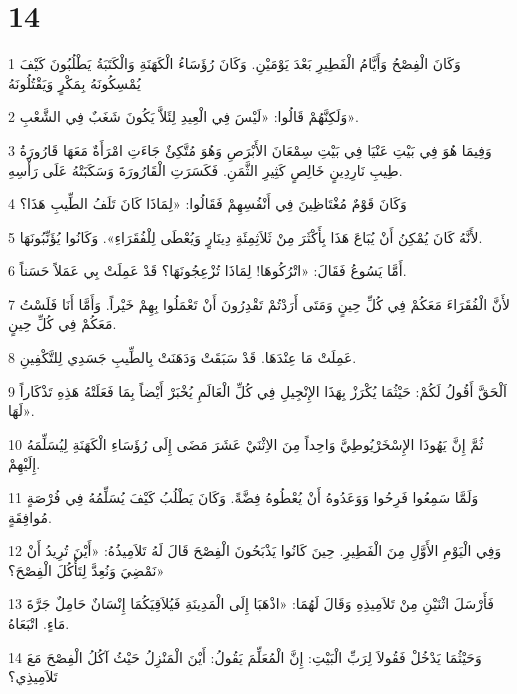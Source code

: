 \chapter{14}

\par 1 وَكَانَ الْفِصْحُ وَأَيَّامُ الْفَطِيرِ بَعْدَ يَوْمَيْنِ. وَكَانَ رُؤَسَاءُ الْكَهَنَةِ وَالْكَتَبَةُ يَطْلُبُونَ كَيْفَ يُمْسِكُونَهُ بِمَكْرٍ وَيَقْتُلُونَهُ
\par 2 وَلَكِنَّهُمْ قَالُوا: «لَيْسَ فِي الْعِيدِ لِئَلاَّ يَكُونَ شَغَبٌ فِي الشَّعْبِ».
\par 3 وَفِيمَا هُوَ فِي بَيْتِ عَنْيَا فِي بَيْتِ سِمْعَانَ الأَبْرَصِ وَهُوَ مُتَّكِئٌ جَاءَتِ امْرَأَةٌ مَعَهَا قَارُورَةُ طِيبِ نَارِدِينٍ خَالِصٍ كَثِيرِ الثَّمَنِ. فَكَسَرَتِ الْقَارُورَةَ وَسَكَبَتْهُ عَلَى رَأْسِهِ.
\par 4 وَكَانَ قَوْمٌ مُغْتَاظِينَ فِي أَنْفُسِهِمْ فَقَالُوا: «لِمَاذَا كَانَ تَلَفُ الطِّيبِ هَذَا؟
\par 5 لأَنَّهُ كَانَ يُمْكِنُ أَنْ يُبَاعَ هَذَا بِأَكْثَرَ مِنْ ثَلاَثِمِئَةِ دِينَارٍ وَيُعْطَى لِلْفُقَرَاءِ». وَكَانُوا يُؤَنِّبُونَهَا.
\par 6 أَمَّا يَسُوعُ فَقَالَ: «اتْرُكُوهَا! لِمَاذَا تُزْعِجُونَهَا؟ قَدْ عَمِلَتْ بِي عَمَلاً حَسَناً.
\par 7 لأَنَّ الْفُقَرَاءَ مَعَكُمْ فِي كُلِّ حِينٍ وَمَتَى أَرَدْتُمْ تَقْدِرُونَ أَنْ تَعْمَلُوا بِهِمْ خَيْراً. وَأَمَّا أَنَا فَلَسْتُ مَعَكُمْ فِي كُلِّ حِينٍ.
\par 8 عَمِلَتْ مَا عِنْدَهَا. قَدْ سَبَقَتْ وَدَهَنَتْ بِالطِّيبِ جَسَدِي لِلتَّكْفِينِ.
\par 9 اَلْحَقَّ أَقُولُ لَكُمْ: حَيْثُمَا يُكْرَزْ بِهَذَا الإِنْجِيلِ فِي كُلِّ الْعَالَمِ يُخْبَرْ أَيْضاً بِمَا فَعَلَتْهُ هَذِهِ تَذْكَاراً لَهَا».
\par 10 ثُمَّ إِنَّ يَهُوذَا الإِسْخَرْيُوطِيَّ وَاحِداً مِنَ الاِثْنَيْ عَشَرَ مَضَى إِلَى رُؤَسَاءِ الْكَهَنَةِ لِيُسَلِّمَهُ إِلَيْهِمْ.
\par 11 وَلَمَّا سَمِعُوا فَرِحُوا وَوَعَدُوهُ أَنْ يُعْطُوهُ فِضَّةً. وَكَانَ يَطْلُبُ كَيْفَ يُسَلِّمُهُ فِي فُرْصَةٍ مُوافِقَةٍ.
\par 12 وَفِي الْيَوْمِ الأَوَّلِ مِنَ الْفَطِيرِ. حِينَ كَانُوا يَذْبَحُونَ الْفِصْحَ قَالَ لَهُ تَلاَمِيذُهُ: «أَيْنَ تُرِيدُ أَنْ نَمْضِيَ وَنُعِدَّ لِتَأْكُلَ الْفِصْحَ؟»
\par 13 فَأَرْسَلَ اثْنَيْنِ مِنْ تَلاَمِيذِهِ وَقَالَ لَهُمَا: «اذْهَبَا إِلَى الْمَدِينَةِ فَيُلاَقِيَكُمَا إِنْسَانٌ حَامِلٌ جَرَّةَ مَاءٍ. اتْبَعَاهُ.
\par 14 وَحَيْثُمَا يَدْخُلْ فَقُولاَ لِرَبِّ الْبَيْتِ: إِنَّ الْمُعَلِّمَ يَقُولُ: أَيْنَ الْمَنْزِلُ حَيْثُ آكُلُ الْفِصْحَ مَعَ تَلاَمِيذِي؟
